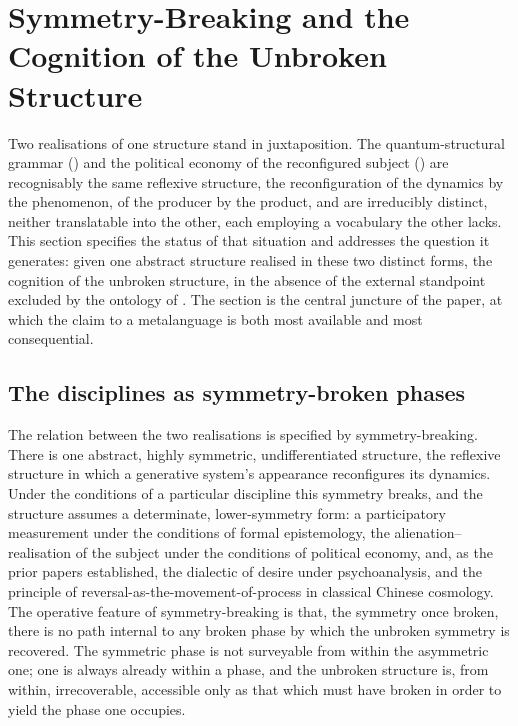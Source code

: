 \section{Symmetry-Breaking and the Cognition of the Unbroken Structure}
\label{p10:sec:breaking}

\noindent
Two realisations of one structure stand in juxtaposition. The quantum-structural grammar () and the political economy of the reconfigured subject () are recognisably the same reflexive structure, the reconfiguration of the dynamics by the phenomenon, of the producer by the product, and are irreducibly distinct, neither translatable into the other, each employing a vocabulary the other lacks. This section specifies the status of that situation and addresses the question it generates: given one abstract structure realised in these two distinct forms, the cognition of the unbroken structure, in the absence of the external standpoint excluded by the ontology of . The section is the central juncture of the paper, at which the claim to a metalanguage is both most available and most consequential.

\subsection{The disciplines as symmetry-broken phases}
\label{p10:sec:phases}

The relation between the two realisations is specified by symmetry-breaking. There is one abstract, highly symmetric, undifferentiated structure, the reflexive structure in which a generative system's appearance reconfigures its dynamics. Under the conditions of a particular discipline this symmetry breaks, and the structure assumes a determinate, lower-symmetry form: a participatory measurement under the conditions of formal epistemology, the alienation--realisation of the subject under the conditions of political economy, and, as the prior papers established, the dialectic of desire under psychoanalysis, and the principle of reversal-as-the-movement-of-process in classical Chinese cosmology. The operative feature of symmetry-breaking is that, the symmetry once broken, there is no path internal to any broken phase by which the unbroken symmetry is recovered. The symmetric phase is not surveyable from within the asymmetric one; one is always already within a phase, and the unbroken structure is, from within, irrecoverable, accessible only as that which must have broken in order to yield the phase one occupies.

